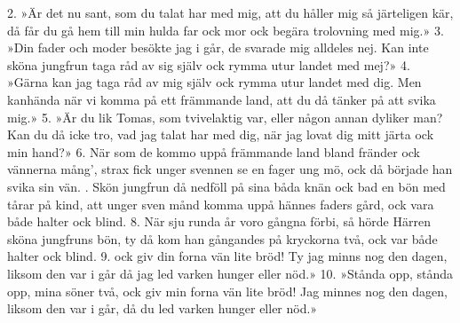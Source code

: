 \begin{adjustwidth}{-1mm}{-1mm}
\setlength{\columnsep}{0.1cm}
\begin{multicols}{2}
2.  »Är det nu sant, som du talat har med mig,
    att du håller mig så järteligen kär,
    då får du gå hem till min hulda far ock mor
    ock begära trolovning med mig.»
3.  »Din fader och moder besökte jag i går,
    de svarade mig alldeles nej.
    Kan inte sköna jungfrun taga råd av sig själv
    ock rymma utur landet med mej?»
4.  »Gärna kan jag taga råd av mig själv
    ock rymma utur landet med dig.
    Men kanhända när vi komma
    \tabto{4cm}på ett främmande land,
    att du då tänker på att svika mig.»
5.  »Är du lik Tomas, som tvivelaktig var,
    eller någon annan dyliker man?
    Kan du då icke tro, vad jag talat har med dig,
    när jag lovat dig mitt järta ock min hand?»
6.  När som de kommo uppå främmande land
    bland fränder ock vännerna mång',
    strax fick unger svennen se en fager ung mö,
    ock då började han svika sin vän.
\vfill{}.  Skön jungfrun då nedföll på sina båda knän
    ock bad en bön med tårar på kind,
    att unger sven månd komma
    \tabto{4.5cm}uppå hännes faders gård,
    ock vara både halter ock blind.
8.  När sju runda år voro gångna förbi,
    så hörde Härren sköna jungfruns bön,
    ty då kom han gångandes på kryckorna två,
    ock var både halter ock blind.
9.  
    ock giv din forna vän lite bröd!
    Ty jag minns nog den dagen, liksom den var i går
    då jag led varken hunger eller nöd.»
10. »Stånda opp, stånda opp, mina söner två,
    ock giv min forna vän lite bröd!
    Jag minnes nog den dagen, liksom den var i går,
    då du led varken hunger eller nöd.»
\end{multicols}
\end{adjustwidth}
